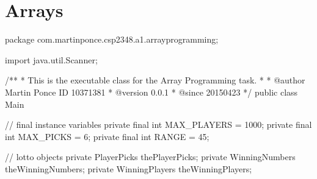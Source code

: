 \newpage
\section{Arrays}

\begin{javacode}
package com.martinponce.csp2348.a1.arrayprogramming;

import java.util.Scanner;

/**
 * This is the executable class for the Array Programming task.
 *
 * @author Martin Ponce ID 10371381
 * @version 0.0.1
 * @since 20150423
 */
public class Main {

    // final instance variables
    private final int MAX_PLAYERS = 1000;
    private final int MAX_PICKS = 6;
    private final int RANGE = 45;

    // lotto objects
    private PlayerPicks thePlayerPicks;
    private WinningNumbers theWinningNumbers;
    private WinningPlayers theWinningPlayers;
}
\end{javacode}